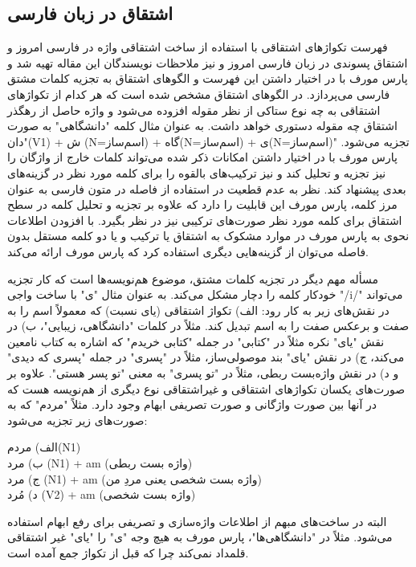 \documentclass[12pt,onecolumn,a4paper]{article}
\begin{document}
    \subsection{اشتقاق در زبان فارسی}
    فهرست تکواژهای اشتقاقی با استفاده از ساخت اشتقاقی واژه در فارسی امروز {\mfo\citep{kalbasi_71}} و اشتقاق پسوندی در زبان فارسی امروز {\mfo\citep{kashani_71}} و نیز ملاحظات نویسندگان این مقاله تهیه شد و پارس مورف با در اختیار داشتن این فهرست و الگوهای اشتقاق به تجزیه کلمات مشتق فارسی می‌پردازد. در الگوهای اشتقاق مشخص شده است که هر کدام از تکواژهای اشتقاقی به چه نوع ستاکی از نظر مقوله افزوده می‌شود و واژه حاصل از رهگذر اشتقاق چه مقوله دستوری خواهد داشت. به عنوان مثال کلمه "دانشگاهی" به صورت "دان(V1) + ش (N=اسم‌ساز) + گاه(N=اسم‌ساز) + ی(N=اسم‌ساز)" تجزیه می‌شود. پارس مورف با در اختیار داشتن امکانات ذکر شده می‌تواند کلمات خارج از واژگان را نیز تجزیه و تحلیل کند و نیز ترکیب‌های بالقوه را برای کلمه مورد نظر در گزینه‌های بعدی پیشنهاد کند. نظر به عدم قطعیت در استفاده از فاصله در متون فارسی به عنوان مرز کلمه، پارس مورف این قابلیت را دارد که علاوه بر تجزیه و تحلیل کلمه در سطح اشتقاق برای کلمه مورد نظر صورت‌های ترکیبی نیز در نظر بگیرد. با افزودن اطلاعات نحوی به پارس مورف در موارد مشکوک به اشتقاق یا ترکیب و یا دو کلمه مستقل بدون فاصله می‌توان از گزینه‌هایی دیگری استفاده کرد که پارس مورف ارائه می‌کند.
    \par
    مسأله مهم دیگر در تجزیه کلمات مشتق، موضوع هم‌نویسه‌ها  است که کار تجزیه خودکار کلمه را دچار مشکل می‌کند. به عنوان مثال "ی" با ساخت واجی "/i/" می‌تواند در نقش‌های زیر به کار رود: الف) تکواژ اشتقاقی (یای نسبت) که معمولاً اسم را به صفت و برعکس صفت را به اسم تبدیل کند. مثلاً در کلمات "دانشگاهی، زیبایی"، ب) در نقش "یای" نکره مثلاً در "کتابی" در جمله "کتابی خریدم" که اشاره به کتاب نامعین می‌کند، ج) در نقش "یای" بند موصولی‌ساز، مثلاً در "پسری" در جمله "پسری که دیدی" و د) در نقش واژه‌بست ربطی، مثلاً در "تو پسری" به معنی "تو پسر هستی". علاوه بر صورت‌های یکسان تکواژهای اشتقاقی و غیراشتقاقی نوع دیگری از هم‌نویسه هست که در آنها بین صورت واژگانی و صورت تصریفی ابهام وجود دارد. مثلاً "مردم" که به صورت‌های زیر تجزیه می‌شود:
    \par
    الف) مردم(N1)
    \\
    ب) مرد (N1) + am (واژه بست ربطی)
    \\
    ج) مرد (N1) + am (واژه بست شخصی یعنی مردِ من)
    \\
    د) مُرد (V2) + am (واژه بست شخصی)
    \par
    البته در ساخت‌های مبهم از اطلاعات واژه‌سازی و تصریفی برای رفع ابهام استفاده می‌شود. مثلاً در "دانشگاهی‌ها"، پارس مورف به هیچ وجه "ی" را "یای" غیر اشتقاقی قلمداد نمی‌کند چرا که قبل از تکواژ جمع آمده است.
\end{document}
